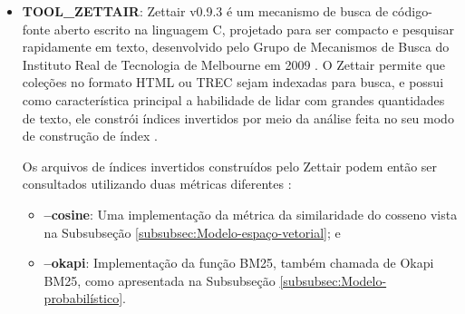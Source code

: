 \begin{itemize}
        Utiliza da linguagem de consulta AQL (\textit{ArangoDB Query Language}) para recuperar e modificar dados, que, por meio das \textit{views}\footnote{EXPLICAR O QUE É UMA VIEW DE BANCO DE DADOS.} do tipo arangosearch, introduz uma camada de integração com a biblioteca IResearch\footnote{Biblioteca de mecanismo de busca orientada a documentos, multiplataforma, e de alto desempenho, escrita inteiramente em C++, com o foco em uma conectividade de diferentes modelos de ranqueamento/similaridade \cite{IRESEARCH_GITHUB_2019}.}.
        Assim, por meio da AQL integrada ao IResearch, o ArangoDB fornece funções de ordenação de documentos mediante uma consulta, e, dentre elas, a função BM25() faz uma implementação do algoritmo da função de ranqueamento BM25 \cite{ARANGODB_SEARCHVIEWS_2019}.
        
        \item \textbf{TOOL\_ZETTAIR}: Zettair v0.9.3 é um mecanismo de busca de código-fonte aberto escrito na linguagem C, projetado para ser compacto e pesquisar rapidamente em texto, desenvolvido pelo Grupo de Mecanismos de Busca do Instituto Real de Tecnologia de Melbourne em 2009 \cite{ZETTAIR_HOME_2009}.
        O Zettair permite que coleções no formato HTML ou TREC sejam indexadas para busca, e possui como característica principal a habilidade de lidar com grandes quantidades de texto, ele constrói índices invertidos por meio da análise feita no seu modo de construção de índex \cite{ZETTAIR_INDEX_2009}.
        
        Os arquivos de índices invertidos construídos pelo Zettair podem então ser consultados utilizando duas métricas diferentes \cite{ZETTAIR_USAGE_2009}:
        \begin{itemize}
            \item \textbf{--cosine}: Uma implementação da métrica da similaridade do cosseno vista na Subsubseção \ref{subsubsec:Modelo-espaço-vetorial}; e
            
            \item \textbf{--okapi}: Implementação da função BM25, também chamada de Okapi BM25, como apresentada na Subsubseção \ref{subsubsec:Modelo-probabilístico}.
        \end{itemize}
        
    \end{itemize}
    

